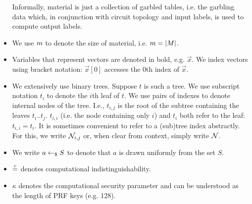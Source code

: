 \begin{itemize}
	Informally, material is just a collection of garbled tables, i.e. the garbling data which, in conjunction with circuit topology and input labels, is used to compute output labels.
\item We use $m$ to denote the size of material, i.e. $m =
  |M|$.
	\item Variables that represent vectors are denoted in bold, e.g.  $\vec{x}$.
	We index vectors using bracket notation: $\vec{x}[0]$ accesses the $0$th index of $\vec{x}$.
\item We extensively use binary trees.
  Suppose $t$ is such a tree. We use subscript notation $t_i$ to denote the
  $i$th leaf of $t$.
  We use pairs of indexes to denote internal nodes of the tree.
  I.e., $t_{i, j}$ is the root of the subtree containing the leaves
  $t_i .. t_j$. $t_{i,i}$ (i.e. the node
  containing only $i$) and $t_i$ both refer to the leaf: $t_{i,i} =
  t_i$.
  It is sometimes convenient to refer to a (sub)tree index abstractly.
  For this, we write $\mathtt{\cal N}_{i, j}$ or, when clear from context,
  simply write $\mathtt{\cal N}$.
	\item We write $a \gets_{\$} S$ to denote that $a$ is drawn
    uniformly from the set $S$.
	\item $\overset{c}{=}$ denotes computational indistinguishability.
	\item $\kappa$ denotes the computational security parameter and can
    be understood as the length of PRF keys (e.g. 128).
\end{itemize}

